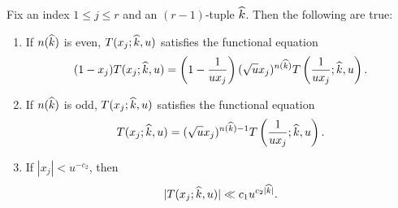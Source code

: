     \begin{proposition}\label{prop:T_functional_equations}
        Fix an index $1 \le j \le r$ and an $(r-1)$-tuple $\widehat{k}$. Then the following are true:
        \begin{enumerate}[label=(\roman*)]
            \item If $n(\widehat{k})$ is even, $T(x_{j};\widehat{k},u)$ satisfies the functional equation
            \[
                (1-x_{j})T(x_{j};\widehat{k},u) = \left(1-\frac{1}{ux_{j}}\right)(\sqrt{u}x_{j})^{n(\widehat{k})}T\left(\frac{1}{ux_{j}};\widehat{k},u\right).
            \]
            \item If $n(\widehat{k})$ is odd, $T(x_{j};\widehat{k},u)$ satisfies the functional equation
            \[
                T(x_{j};\widehat{k},u) = (\sqrt{u}x_{j})^{n(\widehat{k})-1}T\left(\frac{1}{ux_{j}};\widehat{k},u\right).
            \]
            \item If $|x_{j}| < u^{-c_{2}}$, then
            \[
                |T(x_{j};\widehat{k},u)| \ll c_{1}u^{c_{2}|\widehat{k}|}.
            \]
        \end{enumerate}
    \end{proposition}

